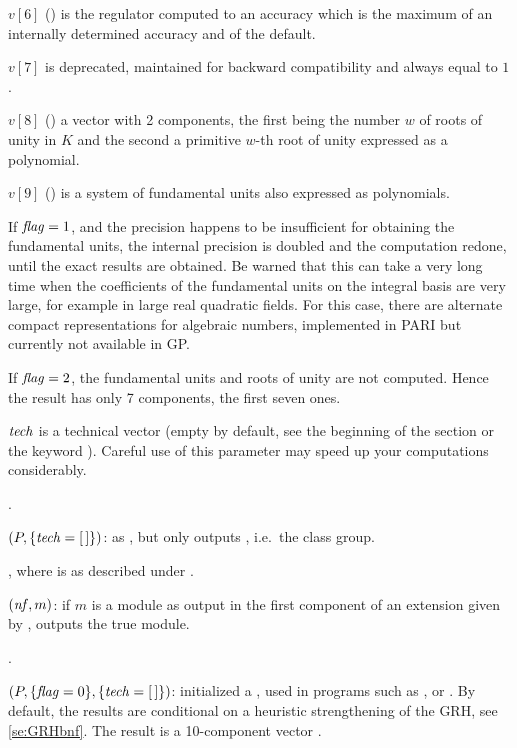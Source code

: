  $v[6]$ () is the regulator computed to an accuracy which is the
maximum of an internally determined accuracy and of the default.

 $v[7]$ is deprecated, maintained for backward compatibility and always equal
to $1$.

 $v[8]$ () a vector with 2 components, the first being the number
$w$ of roots of unity in $K$ and the second a primitive $w$-th root of unity
expressed as a polynomial.

 $v[9]$ () is a system of fundamental units also expressed as
polynomials.

If $\hbox{\it f\kern0pt lag\/}=1$, and the precision happens to be insufficient for obtaining the
fundamental units, the internal precision is doubled and the computation
redone, until the exact results are obtained. Be warned that this can take a
very long time when the coefficients of the fundamental units on the integral
basis are very large, for example in large real quadratic fields.
For this case, there are alternate compact representations for algebraic
numbers, implemented in PARI but currently not available in GP.

If $\hbox{\it f\kern0pt lag\/}=2$, the fundamental units and roots of unity are not computed.
Hence the result has only 7 components, the first seven ones.

$\hbox{\it tech\/}$ is a technical vector (empty by default, see the beginning of
the section or the keyword ). Careful use of this parameter may
speed up your computations considerably.

.

$(P,\{\hbox{\it tech\/}=[\,]\})$: as , but only
outputs , i.e.~the class group.

, where 
is as described under .

$(\hbox{\it nf\/},m)$: if $m$ is a module as output in the
first component of an extension given by , outputs the
true module.

.

$(P,\{\hbox{\it f\kern0pt lag\/}=0\},\{\hbox{\it tech\/}=[\,]\})$: initialized a
, used in programs such as ,  or
. By default, the results are conditional on a heuristic
strengthening of the GRH, see \ref{se:GRHbnf}. The result is a 10-component
vector .


